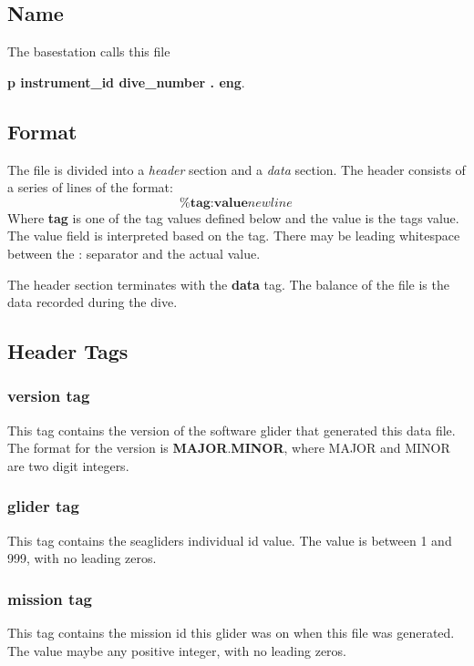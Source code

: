 \documentclass[12pt,english,twoside]{book}
\begin{document}
\subsection{Name}

The basestation calls this file

\textbf{p instrument\_id dive\_number . eng}.


\subsection{Format}

The file is divided into a \textit{header} section and a \textit{data}
section. The header consists of a series of lines of the format: \[
\textbf{\% tag}:\textbf{value}\textit{newline}\]
 Where \textbf{tag} is one of the tag values defined below and the
value is the tags value. The value field is interpreted based on the
tag. There may be leading whitespace between the : separator and the
actual value.

The header section terminates with the \textbf{data} tag. The balance
of the file is the data recorded during the dive.


\subsection{Header Tags}


\subsubsection{version tag}

This tag contains the version of the software glider that generated
this data file. The format for the version is \textbf{MAJOR}.\textbf{MINOR},
where MAJOR and MINOR are two digit integers.


\subsubsection{glider tag}

This tag contains the seagliders individual id value. The value is
between 1 and 999, with no leading zeros.


\subsubsection{mission tag}

This tag contains the mission id this glider was on when this file
was generated. The value maybe any positive integer, with no leading
zeros.
\end{document}
